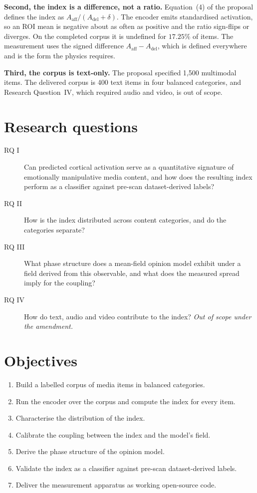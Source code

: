 \textbf{Second, the index is a difference, not a ratio.} Equation~(4) of the proposal defines
the index as $A_{\mathrm{aff}}/(A_{\mathrm{del}} + \delta)$. The encoder emits standardised
activation, so an ROI mean is negative about as often as positive and the ratio sign-flips or
diverges. On the completed corpus it is undefined for $17.25\%$ of items. The measurement uses
the signed difference $A_{\mathrm{aff}} - A_{\mathrm{del}}$, which is defined everywhere and
is the form the physics requires.

\textbf{Third, the corpus is text-only.} The proposal specified 1{,}500 multimodal items. The
delivered corpus is 400 text items in four balanced categories, and Research Question~IV,
which required audio and video, is out of scope.

\section{Research questions}

\begin{description}
\item[RQ I] Can predicted cortical activation serve as a quantitative signature of
emotionally manipulative media content, and how does the resulting index perform as a
classifier against pre-scan dataset-derived labels?

\item[RQ II] How is the index distributed across content categories, and do the categories
separate?

\item[RQ III] What phase structure does a mean-field opinion model exhibit under a field
derived from this observable, and what does the measured spread imply for the coupling?

\item[RQ IV] How do text, audio and video contribute to the index? \emph{Out of scope under
the amendment.}
\end{description}

\section{Objectives}

\begin{enumerate}[label=(\roman*)]
\item Build a labelled corpus of media items in balanced categories.
\item Run the encoder over the corpus and compute the index for every item.
\item Characterise the distribution of the index.
\item Calibrate the coupling between the index and the model's field.
\item Derive the phase structure of the opinion model.
\item Validate the index as a classifier against pre-scan dataset-derived labels.
\item Deliver the measurement apparatus as working open-source code.
\end{enumerate}

